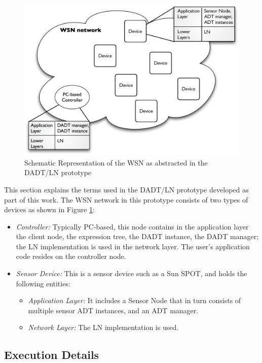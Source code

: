 \begin{figure}
\centering
\label{Fig:DADTLN_glossary}
\includegraphics[scale=0.55]{img/DADTLN_glossary.eps} 
\caption[WSN in DADT/LN prototype
]{Schematic Representation of the WSN as abstracted in the DADT/LN prototype}

\end{figure} 

This section explains the terms used in the DADT/LN prototype developed as part
of this work. The WSN network in this prototype consists of two types of
devices as shown in Figure \ref{Fig:DADTLN_glossary}: 
\begin{itemize}
  \item \emph{Controller:} Typically PC-based, this node contains in the
  application layer the client node, the expression tree, the DADT instance, the
  DADT manager; the LN
  implementation is used in the network layer. The user's application code resides on
  the controller node.
  \item \emph{Sensor Device:} This is a sensor device such as a Sun SPOT, and
  holds the following entities:
  \begin{itemize}
    \item \emph{Application Layer:} It includes a Sensor Node that in turn
    consists of multiple sensor ADT instances, and an ADT manager.
    \item \emph{Network Layer:} The LN implementation is used.
  \end{itemize}
\end{itemize}

\subsection{Execution Details}

